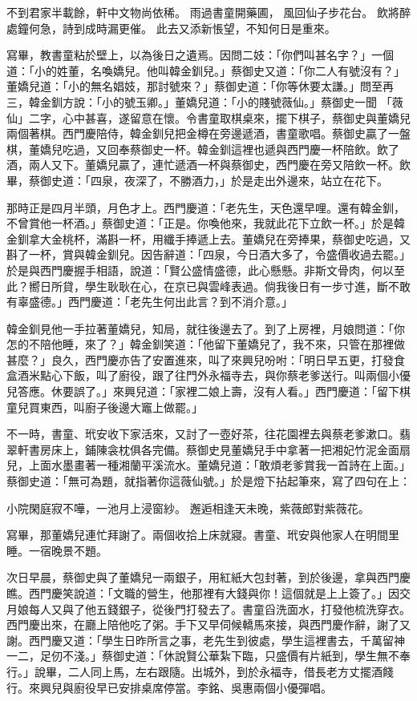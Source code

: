 \begin{showcontents}{}
不到君家半載餘，軒中文物尚依稀。
雨過書童開藥圃，
風回仙子步花台。
飲將醉處鐘何急，詩到成時漏更催。
此去又添新悵望，不知何日是重來。

寫畢，教書童粘於壁上，以為後日之遺焉。因問二妓：「你們叫甚名字？」一個道：「小的姓董，名喚嬌兒。他叫韓金釧兒。」蔡御史又道：「你二人有號沒有？」 董嬌兒道：「小的無名娼妓，那討號來？」蔡御史道：「你等休要太謙。」問至再三，韓金釧方說：「小的號玉卿。」董嬌兒道：「小的賤號薇仙。」蔡御史一聞 「薇仙」二字，心中甚喜，遂留意在懷。令書童取棋桌來，擺下棋子，蔡御史與董嬌兒兩個著棋。西門慶陪侍，韓金釧兒把金樽在旁邊遞酒，書童歌唱。蔡御史贏了一盤棋，董嬌兒吃過，又回奉蔡御史一杯。韓金釧這裡也遞與西門慶一杯陪飲。飲了酒，兩人又下。董嬌兒贏了，連忙遞酒一杯與蔡御史，西門慶在旁又陪飲一杯。飲畢，蔡御史道：「四泉，夜深了，不勝酒力，」於是走出外邊來，站立在花下。

那時正是四月半頭，月色才上。西門慶道：「老先生，天色還早哩。還有韓金釧，不曾賞他一杯酒。」蔡御史道：「正是。你喚他來，我就此花下立飲一杯。」於是韓金釧拿大金桃杯，滿斟一杯，用纖手捧遞上去。董嬌兒在旁捧果，蔡御史吃過，又斟了一杯，賞與韓金釧兒。因告辭道：「四泉，今日酒大多了，令盛價收過去罷。」於是與西門慶握手相語，說道：「賢公盛情盛德，此心懸懸。非斯文骨肉，何以至此？嚮日所貸，學生耿耿在心，在京已與雲峰表過。倘我後日有一步寸進，斷不敢有辜盛德。」西門慶道：「老先生何出此言？到不消介意。」

韓金釧見他一手拉著董嬌兒，知局，就往後邊去了。到了上房裡，月娘問道：「你怎的不陪他睡，來了？」韓金釧笑道：「他留下董嬌兒了，我不來，只管在那裡做甚麼？」良久，西門慶亦告了安置進來，叫了來興兒吩咐：「明日早五更，打發食盒酒米點心下飯，叫了廚役，跟了往門外永福寺去，與你蔡老爹送行。叫兩個小優兒答應。休要誤了。」來興兒道：「家裡二娘上壽，沒有人看。」西門慶道：「留下棋童兒買東西，叫廚子後邊大竈上做罷。」

不一時，書童、玳安收下家活來，又討了一壺好茶，往花園裡去與蔡老爹漱口。翡翠軒書房床上，鋪陳衾枕俱各完備。蔡御史見董嬌兒手中拿著一把湘妃竹泥金面扇兒，上面水墨畫著一種湘蘭平溪流水。董嬌兒道：「敢煩老爹賞我一首詩在上面。」蔡御史道：「無可為題，就指著你這薇仙號。」於是燈下拈起筆來，寫了四句在上：

小院閑庭寂不嘩，一池月上浸窗紗。
邂逅相逢天未晚，紫薇郎對紫薇花。

寫畢，那董嬌兒連忙拜謝了。兩個收拾上床就寢。書童、玳安與他家人在明間里睡。一宿晚景不題。

次日早晨，蔡御史與了董嬌兒一兩銀子，用紅紙大包封著，到於後邊，拿與西門慶瞧。西門慶笑說道：「文職的營生，他那裡有大錢與你！這個就是上上簽了。」因交月娘每人又與了他五錢銀子，從後門打發去了。書童舀洗面水，打發他梳洗穿衣。西門慶出來，在廳上陪他吃了粥。手下又早伺候轎馬來接，與西門慶作辭，謝了又謝。西門慶又道：「學生日昨所言之事，老先生到彼處，學生這裡書去，千萬留神一二，足仞不淺。」蔡御史道：「休說賢公華紮下臨，只盛價有片紙到，學生無不奉行。」說畢，二人同上馬，左右跟隨。出城外，到於永福寺，借長老方丈擺酒餞行。來興兒與廚役早已安排桌席停當。李銘、吳惠兩個小優彈唱。


\end{showcontents}
